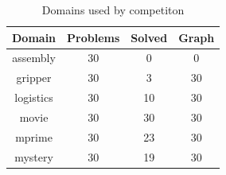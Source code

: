 \documentclass[handout,t]{beamer}
\begin{document}
\begin{frame}
  \begin{table}[h!]
    \centering
    \begin{tabular}{c c c c}  
      Domain & Problems & Solved & Graph \\ [0.5ex] 
      \hline \hline
      assembly  & 30 & 0 & 0   \\
      gripper   & 30 & 3 & 30  \\
      logistics & 30 & 10 & 30 \\
      movie     & 30 & 30 & 30 \\
      mprime    & 30 & 23 & 30 \\
      mystery   & 30 & 19 & 30 \\
      \hline
    \end{tabular}
    \caption{Domains used by competiton}
    \label{table:domaincompetition}
  \end{table}
\end{frame}
\end{document}

